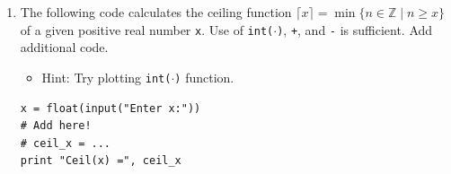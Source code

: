 \documentclass[../main.tex]{subfiles}
\begin{document}
\begin{enumerate}
\item The following code calculates the ceiling function $\lceil x \rceil = \min \{n \in \mathbb{Z} \mid n \geq x\}$ of a given positive real number \texttt{x}.
Use of \texttt{int($\cdot$)}, \texttt{+}, and \texttt{-} is sufficient.
Add additional code.
\begin{itemize}
\item Hint: Try plotting \texttt{int($\cdot$)} function.
\end{itemize}
\begin{verbatim}
x = float(input("Enter x:"))
# Add here!
# ceil_x = ...
print "Ceil(x) =", ceil_x
\end{verbatim}
\end{enumerate}
\end{document}
